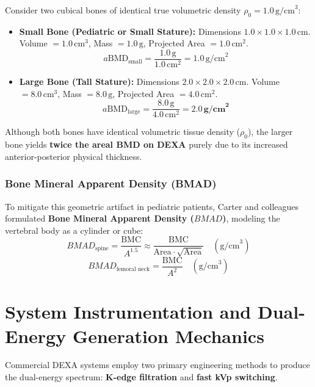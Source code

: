\documentclass[11pt,a4paper]{article}
\begin{document}
Consider two cubical bones of identical true volumetric density $\rho_0 = 1.0\,\text{g/cm}^3$:
\begin{itemize}[leftmargin=*]
    \item \textbf{Small Bone (Pediatric or Small Stature):} Dimensions $1.0 \times 1.0 \times 1.0\,\text{cm}$. Volume $= 1.0\,\text{cm}^3$, Mass $= 1.0\,\text{g}$, Projected Area $= 1.0\,\text{cm}^2$.
    \begin{equation}
        a\text{BMD}_{\text{small}} = \frac{1.0\,\text{g}}{1.0\,\text{cm}^2} = 1.0\,\text{g/cm}^2
    \end{equation}
    \item \textbf{Large Bone (Tall Stature):} Dimensions $2.0 \times 2.0 \times 2.0\,\text{cm}$. Volume $= 8.0\,\text{cm}^3$, Mass $= 8.0\,\text{g}$, Projected Area $= 4.0\,\text{cm}^2$.
    \begin{equation}
        a\text{BMD}_{\text{large}} = \frac{8.0\,\text{g}}{4.0\,\text{cm}^2} = \mathbf{2.0\,\text{g/cm}^2}
    \end{equation}
\end{itemize}
Although both bones have identical volumetric tissue density ($\rho_0$), the larger bone yields \textbf{twice the areal BMD on DEXA} purely due to its increased anterior-posterior physical thickness.

\subsubsection{Bone Mineral Apparent Density (BMAD)}
To mitigate this geometric artifact in pediatric patients, Carter and colleagues formulated \textbf{Bone Mineral Apparent Density ($BMAD$)}, modeling the vertebral body as a cylinder or cube:
\begin{equation}
    BMAD_{\text{spine}} = \frac{\text{BMC}}{A^{1.5}} \approx \frac{\text{BMC}}{\text{Area} \cdot \sqrt{\text{Area}}} \quad \left( \text{g/cm}^3 \right)
\end{equation}
\begin{equation}
    BMAD_{\text{femoral neck}} = \frac{\text{BMC}}{A^2} \quad \left( \text{g/cm}^3 \right)
\end{equation}

\newpage
\section{System Instrumentation and Dual-Energy Generation Mechanics}

Commercial DEXA systems employ two primary engineering methods to produce the dual-energy spectrum: \textbf{K-edge filtration} and \textbf{fast kVp switching}.
\end{document}
